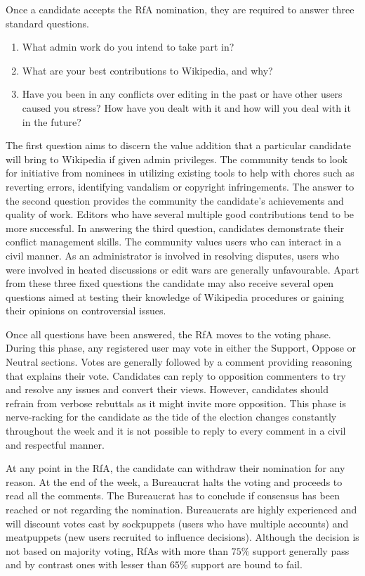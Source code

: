 Once a candidate accepts the RfA nomination, they are required to answer three standard questions. 
\begin{enumerate}
    \item What admin work do you intend to take part in?
    \item What are your best contributions to Wikipedia, and why?
    \item Have you been in any conflicts over editing in the past or have other users caused you stress? How have you dealt with it and how will you deal with it in the future?
\end{enumerate}
The first question aims to discern the value addition that a particular candidate will bring to Wikipedia if given admin privileges.
The community tends to look for initiative from nominees in utilizing existing tools to help with chores such as reverting errors, identifying vandalism or copyright infringements.
The answer to the second question provides the community the candidate's achievements and quality of work.
Editors who have several multiple good contributions tend to be more successful.
In answering the third question, candidates demonstrate their conflict management skills.
The community values users who can interact in a civil manner.
As an administrator is involved in resolving disputes, users who were involved in heated discussions or edit wars are generally unfavourable.
Apart from these three fixed questions the candidate may also receive several open questions aimed at testing their knowledge of Wikipedia procedures or gaining their opinions on controversial issues.

Once all questions have been answered, the RfA moves to the voting phase.
During this phase, any registered user may vote in either the Support, Oppose or Neutral sections.
Votes are generally followed by a comment providing reasoning that explains their vote.
Candidates can reply to opposition commenters to try and resolve any issues and convert their views.
However, candidates should refrain from verbose rebuttals as it might invite more opposition.
This phase is nerve-racking for the candidate as the tide of the election changes constantly throughout the week and it is not possible to reply to every comment in a civil and respectful manner.

At any point in the RfA, the candidate can withdraw their nomination for any reason.
At the end of the week, a Bureaucrat halts the voting and proceeds to read all the comments.
The Bureaucrat has to conclude if consensus has been reached or not regarding the nomination.
Bureaucrats are highly experienced and will discount votes cast by sockpuppets (users who have multiple accounts) and meatpuppets (new users recruited to influence decisions).
Although the decision is not based on majority voting, RfAs with more than $75\%$ support generally pass and by contrast ones with lesser than $65\%$ support are bound to fail.  

